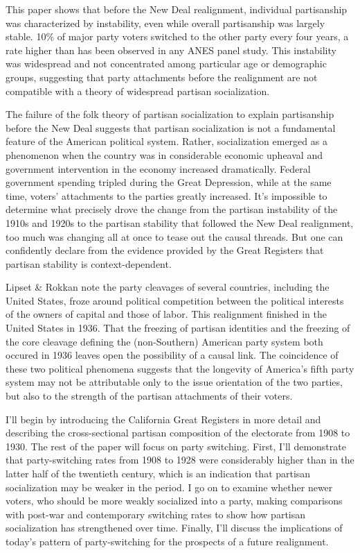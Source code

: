 \documentclass[11pt]{scrartcl}\usepackage[]{graphicx}\usepackage[]{color}
\begin{document}
This paper shows that before the New Deal realignment, individual partisanship was characterized by instability, even while overall partisanship was largely stable. 10\% of major party voters switched to the other party every four years, a rate higher than has been observed in any ANES panel study. This instability was widespread and not concentrated among particular age or demographic groups, suggesting that party attachments before the realignment are not compatible with a theory of widespread partisan socialization. 

The failure of the folk theory of partisan socialization  to explain partisanship before the New Deal suggests that partisan socialization is not a fundamental feature of the American political system. Rather, socialization emerged as a phenomenon when the country was in considerable economic upheaval and government intervention in the economy increased dramatically. Federal government spending tripled during the Great Depression, while at the same time, voters' attachments to the parties greatly increased. It's impossible to determine what precisely drove the change from the partisan instability of the 1910s and 1920s to the partisan stability that followed the New Deal realignment, too much was changing all at once to tease out the causal threads. But one can confidently declare from the evidence provided by the Great Registers that partisan stability is context-dependent.

Lipset \& Rokkan \citeyearpar{lipset1967cleavage} note the party cleavages of several countries, including the United States, froze around political competition between the political interests of the owners of capital and those of labor. This realignment finished in the United States in 1936. That the freezing of partisan identities  and the freezing of the core cleavage defining the (non-Southern) American party system both occured in 1936 leaves open the possibility of a causal link. The coincidence of these two political phenomena suggests that the longevity of America's fifth party system may not be attributable only to the issue orientation of the two parties, but also to the strength of the partisan attachments of their voters.

I'll begin by introducing the California Great Registers in more detail and describing the cross-sectional partisan composition of the electorate from 1908 to 1930. The rest of the paper will focus on party switching. First, I'll demonstrate that party-switching rates from 1908 to 1928 were considerably higher than in the latter half of the twentieth century, which is an indication that partisan socialization may be weaker in the period. I go on to examine whether newer voters, who should be more weakly socialized into a party, making comparisons with post-war and contemporary switching rates to show how partisan socialization has strengthened over time. Finally, I'll discuss the implications of today's pattern of party-switching for the prospects of a future realignment. 
\end{document}
